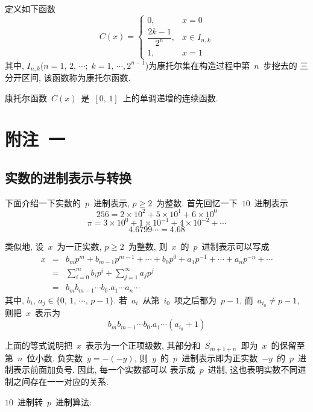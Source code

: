 \begin{definition}
定义如下函数
\[
C(x)=\left\{\!\!
\begin{array}{cl}
0, & x = 0 \\[0.2cm]
\dfrac{2k-1}{2^n}, & x \in I_{n,k}  \\[0.2cm]
1, & x = 1
\end{array}
\right.
\]
其中, $I_{n,k}$($n=1,\,2,\,\cdots; \; k=1,\,\cdots, 2^{n-1}$)为康托尔集在构造过程中第~$n$~步挖去的
三分开区间, 该函数称为康托尔函数.
\end{definition}

康托尔函数~$C(x)$~是~$[0,\,1]$~上的单调递增的连续函数.

\newpage

\section*{附注~一}

\subsection*{实数的进制表示与转换}

下面介绍一下实数的~$p$~进制表示, $p \geqslant 2$~为整数. 首先回忆一下~$10$~进制表示
\[
256 = 2 \times 10^2 + 5 \times 10^1 + 6 \times 10^0
\]
\[
\pi = 3 \times 10^0 + 1 \times 10^{-1} + 4 \times 10^{-2} + \cdots
\]
\[
4.6799\cdots = 4.68
\]

类似地, 设~$x$~为一正实数, $p \geqslant 2$~为整数, 则~$x$~的~$p$~进制表示可以写成
\begin{eqnarray*}
x &=& b_m p^m + b_{m-1} p^{m-1} + \cdots + b_0 p^0 + a_1 p^{-1} + \cdots + a_n p^{-n} + \cdots \\
&=& \sum_{i=0} ^m b_i p^i + \sum_{j=1} ^\infty a_j p^j \\
&=& b_m b_{m-1} \cdots b_0.a_1 \cdots a_n \cdots
\end{eqnarray*}
其中, $b_i,\,a_j \in \{0,\,1,\,\cdots,\, p-1\}$. 若~$a_i$~从第~$i_0$~项之后都为~$p-1$, 而~$a_{i_0} \neq p-1$, 则把~$x$~表示为
\[
b_m b_{m-1} \cdots b_0.a_1 \cdots (a_{i_0}+1)
\]

上面的等式说明把~$x$~表示为一个正项级数, 其部分和~$S_{m+1+n}$~即为~$x$~的保留至第~$n$~位小数. 负实数~$y = - (-y)$, 则~$y$~的~$p$~进制表示即为正实数~$-y$~的~$p$~进制表示前面加负号. 因此, 每一个实数都可以
表示成~$p$~进制, 这也表明实数不同进制之间存在一一对应的关系.

$10$~进制转~$p$~进制算法:

\medskip

